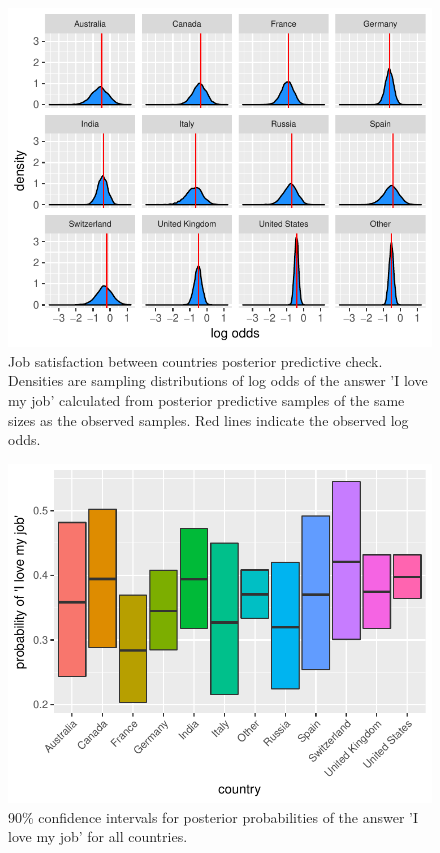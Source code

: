 \documentclass{article}
\begin{document}
\begin{figure}[H]
\centering
\includegraphics{report-010}
\caption{Job satisfaction between countries posterior predictive check. Densities are sampling distributions of log odds of the answer 'I love my job' calculated from posterior predictive samples of the same sizes as the observed samples. Red lines indicate the observed log odds.}\label{fig_1}
\end{figure}


\begin{figure}[H]
\centering
\includegraphics{report-012}
\caption{90\% confidence intervals for posterior probabilities of the answer 'I love my job' for all countries.}\label{fig_2}
\end{figure}
\end{document}
